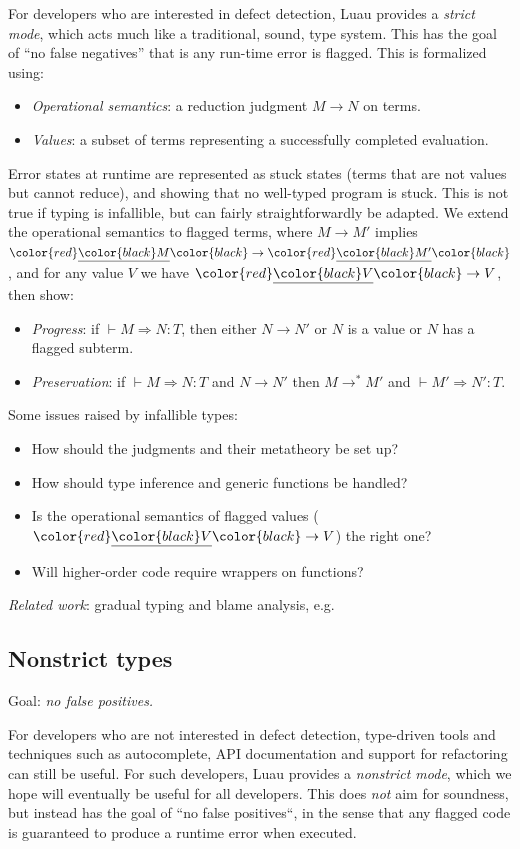 \documentclass[acmsmall]{acmart}
\newcommand{\squnder}[1]{\color{red}\underline{{\color{black}#1}}\color{black}}
\begin{document}
For developers who are interested in defect detection, Luau provides a \emph{strict mode},
which acts much like a traditional, sound, type system. This has the goal of ``no false negatives'' that is any
run-time error is flagged. This is formalized using:
\begin{itemize}
\item \emph{Operational semantics}: a reduction judgment $M \rightarrow N$ on terms.
\item \emph{Values}: a subset of terms representing a successfully completed evaluation.
\end{itemize}
Error states at runtime are represented as stuck states (terms that are not
values but cannot reduce), and showing that no well-typed program is
stuck. This is not true if typing is infallible, but can fairly
straightforwardly be adapted. We extend the operational semantics to flagged terms,
where $M \rightarrow M'$ implies $\squnder{M} \rightarrow \squnder{M'}$, and
for any value $V$ we have $\squnder{V} \rightarrow V$, then show:
\begin{itemize}
\item \emph{Progress}: if ${} \vdash M \Rightarrow N : T$, then either $N \rightarrow N'$ or $N$ is a value or $N$ has a flagged subterm.
\item \emph{Preservation}: if ${} \vdash M \Rightarrow N : T$ and $N \rightarrow N'$ then  $M \rightarrow^*M'$ and ${} \vdash M' \Rightarrow N' : T$.
\end{itemize}
Some issues raised by infallible types:
\begin{itemize}
\item How should the judgments and their metatheory be set up?
\item How should type inference and generic functions be handled?
\item Is the operational semantics of flagged values
  ($\squnder{V} \rightarrow V$) the right one?
\item Will higher-order code require wrappers on functions? 
\end{itemize}
\emph{Related work}: gradual typing and blame analysis, e.g.~\cite{GradualTyping,WellTyped,Contracts}

\subsection{Nonstrict types}

Goal: \emph{no false positives.}

For developers who are not interested in defect detection, type-driven
tools and techniques such as autocomplete, API documentation
and support for refactoring can still be useful.
For such developers, Luau provides a
\emph{nonstrict mode}, which we hope will eventually be useful for all
developers. This does \emph{not} aim for soundness, but instead has
the goal of ``no false positives``, in the sense that any flagged code
is guaranteed to produce a runtime error when executed.
\end{document}

